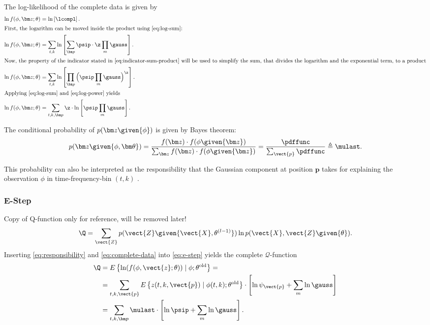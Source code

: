 The log-likelihood of the complete data is given by
\begin{align}
    \ln f(\phi,\bm z; \theta) &= \ln \left [ \lcompl \right ].\\
    \intertext{First, the logarithm can be moved inside the product using \eqref{eq:log-sum}:}
    \ln f(\phi,\bm z; \theta) &=\sum_{t,k}\ln \left [\sum_{\bm p}\psip\cdot\z\prod_{m}\gauss\right ].\\
    \intertext{Now, the property of the indicator stated in \eqref{eq:indicator-sum-product} will be used to simplify the sum, that divides the logarithm and the exponential term, to a product}
    \ln f(\phi,\bm z; \theta) &=\sum_{t,k}\ln \left [\prod_{\bm p}\Big (\psip\prod_{m}\gauss\Big )^{\z}\right ].\\
    \intertext{Applying \eqref{eq:log-sum} and \eqref{eq:log-power} yields}
    \label{eq:complete-data}
    \ln f(\phi,\bm z; \theta) &=\sum_{t,k,\bm p}\z\cdot\ln \left [\psip\prod_{m}\gauss\right ].
\end{align}

The conditional probability of $p(\bm z\given{\phi})$ is given by Bayes theorem:
\begin{equation}
\label{eq:responsibility}
    p(\bm z\given{\phi,\bm\theta})=\frac{f(\bm z)\cdot f(\phi\given{\bm z})}{\sum_{\bm z}f(\bm z)\cdot f(\phi\given{\bm z})}=\frac{\pdffunc}{\sum_{\vect{p}}\pdffunc}\triangleq\mulast .
\end{equation}

This probability can also be interpreted as the responsibility that the Gaussian component at position $\bm p$ takes for explaining the observation $\phi$ in time-frequency-bin $(t,k)$ \cite[p.432]{Bishop2006}.

\subsubsection*{E-Step}
Copy of Q-function only for reference, will be removed later!
\begin{equation}
    \Q=\sum_\vect{Z}p(\vect{Z}\given{\vect{X}, \theta^{(l-1)}})\ln p(\vect{X},\vect{Z}\given{\theta}).
\end{equation} 
Inserting \eqref{eq:responsibility} and \eqref{eq:complete-data} into \eqref{eq:e-step} yields the complete $\mathcal{Q}$-function
\begin{align}
    \Q &=E\left\{\ln(f(\phi,\vect{z};\theta))\mid \phi;\theta^{\text{old}}\right\}=\\
       &=\sum_{t,k,\vect{p}}E\left\{z(t,k,\vect{p})\mid\phi(t,k);\theta^{\text{old}}\right\}\cdot\left [ \ln\psi_{\vect{p}}+\sum_{m}\ln\gauss\right]\nonumber\\
       &= \sum_{t,k,\bm p}\mulast\cdot\left [\ln\psip+\sum_{m}\ln\gauss\right ].
\end{align}

